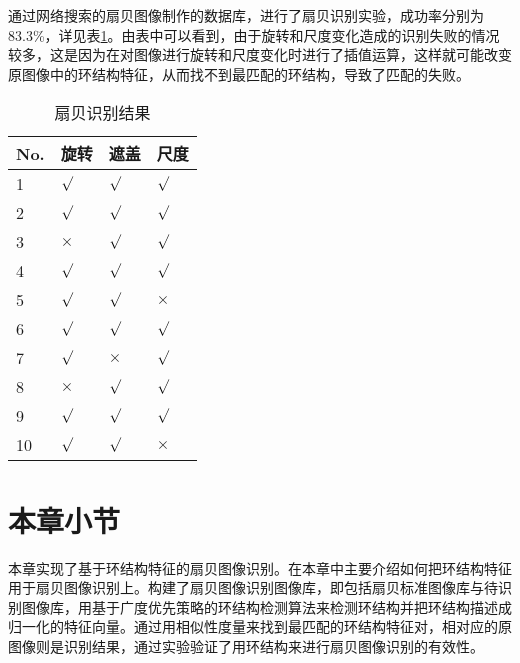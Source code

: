 通过网络搜索的扇贝图像制作的数据库，进行了扇贝识别实验，成功率分别为83.3\%，详见表\ref{tab:recognition}。由表中可以看到，由于旋转和尺度变化造成的识别失败的情况较多，这是因为在对图像进行旋转和尺度变化时进行了插值运算，这样就可能改变原图像中的环结构特征，从而找不到最匹配的环结构，导致了匹配的失败。
\begin{table}
\caption{扇贝识别结果}
\centering
\begin{tabular}{p{1cm}<{\centering}p{1cm}<{\centering}p{1cm}<{\centering}p{1cm}<{\centering}}
  \hline
  No. & 旋转 & 遮盖 & 尺度\\
  \hline
  \rowcolor{gray!50}
  1 & $\surd$  & $\surd$     & $\surd$ \\
  2 & $\surd$  & $\surd$     & $\surd$ \\
  \rowcolor{gray!50}
  3 & $\times$  & $\surd$  & $\surd$\\
  4 & $\surd$  & $\surd$  & $\surd$ \\
  \rowcolor{gray!50}
  5 & $\surd$     & $\surd$     & $\times$\\
  6 & $\surd$      & $\surd$      & $\surd$\\
  \rowcolor{gray!50}
  7 & $\surd$  & $\times$      & $\surd$  \\
  8 & $\times$  & $\surd$  & $\surd$ \\
  \rowcolor{gray!50}
  9 & $\surd$ & $\surd$  & $\surd$\\
  10 & $\surd$  & $\surd$  & $\times$ \\
  \hline
\end{tabular}
\label{tab:recognition}
\end{table}

\section{本章小节}
\label{}
本章实现了基于环结构特征的扇贝图像识别。在本章中主要介绍如何把环结构特征用于扇贝图像识别上。构建了扇贝图像识别图像库，即包括扇贝标准图像库与待识别图像库，用基于广度优先策略的环结构检测算法来检测环结构并把环结构描述成归一化的特征向量。通过用相似性度量来找到最匹配的环结构特征对，相对应的原图像则是识别结果，通过实验验证了用环结构来进行扇贝图像识别的有效性。


